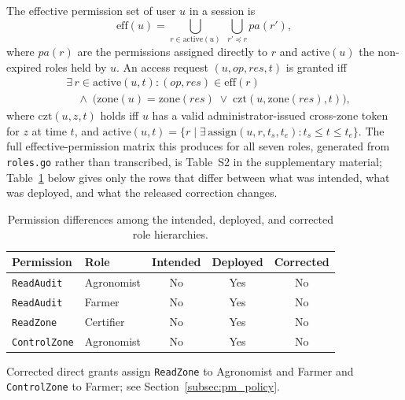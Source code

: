 \documentclass[a4paper,fleqn]{cas-sc}
\begin{document}
The effective permission set of user $u$ in a session is
\begin{equation}
\mathrm{eff}(u) = \bigcup_{r \in \mathrm{active}(u)}
  \; \bigcup_{r' \preceq r} pa(r'),
\end{equation}
where $pa(r)$ are the permissions assigned directly to $r$ and
$\mathrm{active}(u)$ the non-expired roles held by $u$. An access request
$(u, \mathit{op}, \mathit{res}, t)$ is granted iff
\begin{equation}
\begin{aligned}
&\exists\, r \in \mathrm{active}(u,t):
  (\mathit{op},\mathit{res}) \in \mathrm{eff}(r)\\
&\quad \land\;
  \bigl(\mathrm{zone}(u) = \mathrm{zone}(\mathit{res})
  \;\lor\; \mathrm{czt}(u, \mathrm{zone}(\mathit{res}), t)\bigr),
\end{aligned}
\label{eq:grant}
\end{equation}
where $\mathrm{czt}(u,z,t)$ holds iff $u$ has a valid administrator-issued
cross-zone token for $z$ at time $t$, and
$\mathrm{active}(u,t) = \{r \mid \exists\,\mathrm{assign}(u,r,t_s,t_e):
t_s \le t \le t_e\}$. The full effective-permission matrix this produces for
all seven roles, generated from \texttt{roles.go} rather than transcribed,
is Table~S2 in the supplementary material; Table~\ref{tab:permdiff} below
gives only the rows that differ between what was intended, what was
deployed, and what the released correction changes.

\begin{table}[pos=t]
\caption{Permission differences among the intended, deployed, and corrected role hierarchies.}
\label{tab:permdiff}
\footnotesize
\begin{tabularx}{\columnwidth}{@{}lXccc@{}}
\toprule
Permission & Role & Intended & Deployed & Corrected \\
\midrule
\texttt{ReadAudit}   & {\scriptsize Agronomist} & No & Yes & No \\
\texttt{ReadAudit}   & Farmer     & No & Yes & No \\
\texttt{ReadZone}    & Certifier  & No & Yes & No \\
\texttt{ControlZone} & {\scriptsize Agronomist} & No & Yes & No \\
\bottomrule
\end{tabularx}
\par\smallskip
\footnotesize Corrected direct grants assign \texttt{ReadZone} to Agronomist
and Farmer and \texttt{ControlZone} to Farmer; see
Section~\ref{subsec:pm_policy}.
\end{table}
\end{document}
